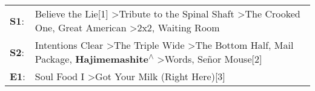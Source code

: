 \begin{supertabular}{p{0.03\textwidth}p{0.92\textwidth}}
 \textbf{S1}:  &                                                 Believe the Lie[1]\textsuperscript{} \textgreater \enspace Tribute to the Spinal Shaft\textsuperscript{} \textgreater \enspace The Crooked One\textsuperscript{}, \enspace Great American\textsuperscript{} \textgreater \enspace 2x2\textsuperscript{}, \enspace Waiting Room\textsuperscript{}  \enspace  \\
 \textbf{S2}:  &  Intentions Clear\textsuperscript{} \textgreater \enspace The Triple Wide\textsuperscript{} \textgreater \enspace The Bottom Half\textsuperscript{}, \enspace Mail Package\textsuperscript{}, \enspace \textbf{Hajimemashite\textsuperscript{$\wedge$}} \textgreater \enspace Words\textsuperscript{}, \enspace Señor Mouse[2]\textsuperscript{}  \enspace  \\
 \textbf{E1}:  &                                                                                                                                                                                                                                              Soul Food I\textsuperscript{} \textgreater \enspace Got Your Milk (Right Here)[3]\textsuperscript{}  \enspace  \\
\end{supertabular}
